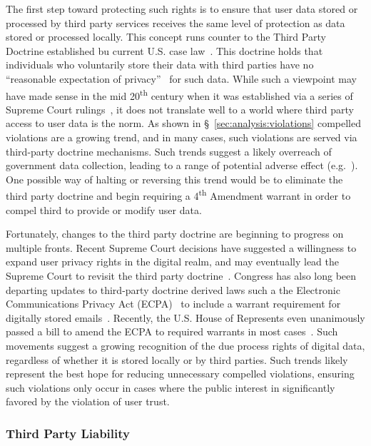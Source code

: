 The first step toward protecting such rights is to ensure that user
data stored or processed by third party services receives the same
level of protection as data stored or processed locally. This concept
runs counter to the Third Party Doctrine established bu current
U.S. case law~\cite{thompson-thirdparty}. This doctrine holds that
individuals who voluntarily store their data with third parties have
no ``reasonable expectation of privacy''~\cite{scotus-katzvus} for
such data. While such a viewpoint may have made sense in the mid
20\textsuperscript{th} century when it was established via a series of
Supreme Court rulings~\cite{scotus-usvmiller-privacy,
  scotus-smithvmaryland}, it does not translate well to a world where
third party access to user data is the norm. As shown in
\S~\ref{sec:analysis:violations} compelled violations are a growing
trend, and in many cases, such violations are served via third-party
doctrine mechanisms. Such trends suggest a likely overreach of
government data collection, leading to a range of potential adverse
effect (e.g.~\cite{penney2016}). One possible way of halting or
reversing this trend would be to eliminate the third party doctrine
and begin requiring a 4\textsuperscript{th} Amendment warrant in order
to compel third to provide or modify user data.

Fortunately, changes to the third party doctrine are beginning to
progress on multiple fronts. Recent Supreme Court decisions have
suggested a willingness to expand user privacy rights in the digital
realm, and may eventually lead the Supreme Court to revisit the third
party doctrine~\cite{scotus-usvjones}.  Congress has also long been
departing updates to third-party doctrine derived laws such a the
Electronic Communications Privacy Act (ECPA)~\cite{ecpa} to include a
warrant requirement for digitally stored
emails~\cite{eff-ecpareform}. Recently, the U.S. House of Represents
even unanimously passed a bill to amend the ECPA to required warrants
in most cases~\cite{trujillo-ecpa}. Such movements suggest a growing
recognition of the due process rights of digital data, regardless of
whether it is stored locally or by third parties. Such trends likely
represent the best hope for reducing unnecessary compelled violations,
ensuring such violations only occur in cases where the public interest
in significantly favored by the violation of user trust.

\subsubsection{Third Party Liability}

